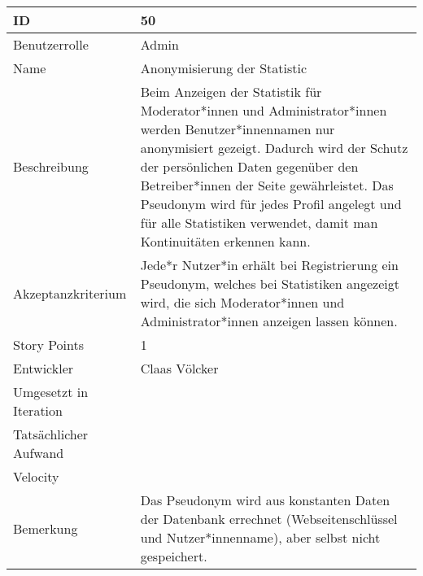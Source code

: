 \begin{tabularx}{\textwidth}{|p{}|X|}
	\hline
	ID & 50\\
	\hline
	Benutzerrolle & Admin\\
	\hline
	Name & Anonymisierung der Statistic\\
	\hline
	Beschreibung & Beim Anzeigen der Statistik für Moderator*innen und Administrator*innen werden Benutzer*innennamen nur anonymisiert gezeigt. Dadurch wird der Schutz der persönlichen Daten gegenüber den Betreiber*innen der Seite gewährleistet. Das Pseudonym wird für jedes Profil angelegt und für alle Statistiken verwendet, damit man Kontinuitäten erkennen kann.\\
	\hline
	Akzeptanzkriterium & Jede*r Nutzer*in erhält bei Registrierung ein Pseudonym, welches bei Statistiken angezeigt wird, die sich Moderator*innen und Administrator*innen anzeigen lassen können.\\
	\hline
	Story Points & 1\\
	\hline
	Entwickler & Claas Völcker\\
	\hline
	Umgesetzt in Iteration & \\
	\hline
	Tatsächlicher Aufwand & \\
	\hline
	Velocity & \\
	\hline
	Bemerkung & Das Pseudonym wird aus konstanten Daten der Datenbank errechnet (Webseitenschlüssel und Nutzer*innenname), aber selbst nicht gespeichert.\\
	\hline
\end{tabularx}
\vspace{20pt}
